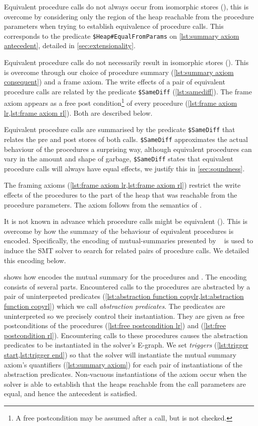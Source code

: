 \documentclass[runningheads,a4paper]{llncs}
\begin{document}
Equivalent procedure calls do not always occur from isomorphic stores (\textbf{\ctwo{}}), this is overcome by considering only the region of the heap reachable from the procedure parameters when trying to establish equivalence of procedure calls. This corresponds to the predicate \texttt{\$Heap\#EqualFromParams} on \cref{lst:summary axiom antecedent}, detailed in \cref{sec:extensionality}. 

Equivalent procedure calls do not necessarily result in isomorphic stores (\textbf{\cthree}). This is overcome through our choice of procedure summary (\cref{lst:summary axiom consequent}) and a frame axiom. The write effects of a pair of equivalent procedure calls are related by the predicate \texttt{\$SameDiff} (\cref{lst:samediff}). The frame axiom appears as a free post condition\footnote{A free postcondition may be assumed after a call, but is not checked.} of every procedure (\cref{lst:frame axiom lr,lst:frame axiom rl}).  Both are described below.

Equivalent procedure calls are summarised by the predicate \texttt{\$SameDiff} that relates the pre and post stores of both calls. \texttt{\$SameDiff} approximates the actual behaviour of the procedures a surprising way, although equivalent procedures can vary in the amount and shape of garbage, \texttt{\$SameDiff} states that equivalent procedure calls will always have equal effects, we justify this in \cref{sec:soundness}.

The framing axioms (\cref{lst:frame axiom lr,lst:frame axiom rl}) restrict the write effects of the procedures to the part of the heap that was reachable from the procedure parameters. The axiom follows from the semantics of \lang{}.

It is not known in advance which procedure calls might be equivalent (\textbf{\cfour{}}). This is overcome by how the summary of the behaviour of equivalent procedures is encoded. Specifically, the encoding of mutual-summaries presented by \citeauthor{Hawblitzel2013}~\cite{Hawblitzel2013} is used to induce the SMT solver to search for related pairs of procedure calls. We detailed this encoding below. 

 shows how \tool{} encodes the mutual summary for the procedures \copylr{} and \copyrl{}. The encoding consists of several parts. Encountered calls to the procedures are abstracted by a pair of uninterpreted predicates (\cref{lst:abstraction function copylr,lst:abstraction function copyrl}) which we call \emph{abstraction predicates}. The predicates are uninterpreted so we precisely control their instantiation. They are given as free postconditions of the procedures \copylr{} (\cref{lst:free postcondition lr}) and \copyrl{} (\cref{lst:free postcondition rl}). Encountering calls to these procedures causes the abstraction predicates to be instantiated in the solver's E-graph. We set \emph{triggers} (\cref{lst:trigger start,lst:trigger end}) so that the solver will instantiate the mutual summary axiom's quantifiers (\cref{lst:summary axiom}) for each pair of instantiations of the abstraction predicates. Non-vacuous instantiations of the axiom occur when the solver is able to establish that the heaps reachable from the call parameters are equal, and hence the antecedent is satisfied.
\end{document}
